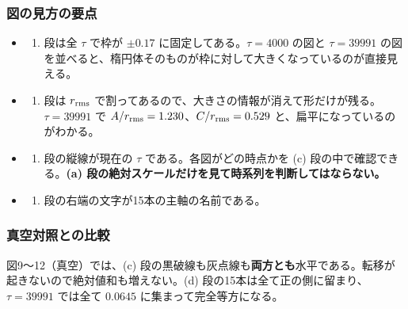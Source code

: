 \documentclass[
  10pt,
]{ltjsarticle}
\providecommand{\tightlist}{%
  \setlength{\itemsep}{0pt}\setlength{\parskip}{0pt}}
\begin{document}
\subsubsection{図の見方の要点}\label{ux56f3ux306eux898bux65b9ux306eux8981ux70b9}

\begin{itemize}
\tightlist
\item
  \begin{enumerate}
  \def\labelenumi{(\alph{enumi})}
  \tightlist
  \item
    段は全 \(\tau\) で枠が \(\pm 0.17\) に固定してある。\(\tau = 4000\)
    の図と \(\tau = 39991\)
    の図を並べると、楕円体そのものが枠に対して大きくなっているのが直接見える。
  \end{enumerate}
\item
  \begin{enumerate}
  \def\labelenumi{(\alph{enumi})}
  \setcounter{enumi}{1}
  \tightlist
  \item
    段は \(r_{\rm rms}\)
    で割ってあるので、大きさの情報が消えて形だけが残る。\(\tau = 39991\)
    で \(A/r_{\rm rms} = 1.230\)、\(C/r_{\rm rms} = 0.529\)
    と、扁平になっているのがわかる。
  \end{enumerate}
\item
  \begin{enumerate}
  \def\labelenumi{(\alph{enumi})}
  \setcounter{enumi}{2}
  \tightlist
  \item
    段の縦線が現在の \(\tau\) である。各図がどの時点かを (c)
    段の中で確認できる。\textbf{(a)
    段の絶対スケールだけを見て時系列を判断してはならない。}
  \end{enumerate}
\item
  \begin{enumerate}
  \def\labelenumi{(\alph{enumi})}
  \setcounter{enumi}{3}
  \tightlist
  \item
    段の右端の文字が15本の主軸の名前である。
  \end{enumerate}
\end{itemize}

\subsubsection{真空対照との比較}\label{ux771fux7a7aux5bfeux7167ux3068ux306eux6bd4ux8f03}

図9〜12（真空）では、(c)
段の黒破線も灰点線も\textbf{両方とも}水平である。転移が起きないので絶対値和も増えない。(d)
段の15本は全て正の側に留まり、\(\tau = 39991\) では全て \(0.0645\)
に集まって完全等方になる。
\end{document}
